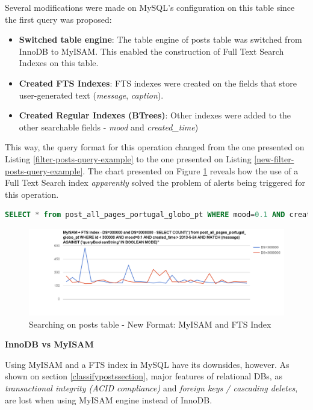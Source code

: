 Several modifications were made on MySQL's configuration on this table since the first query was proposed:
\begin{itemize}
\item{\textbf{Switched table engine}: The table engine of posts table was switched from InnoDB to MyISAM. This enabled the construction of Full Text Search Indexes on this table.}
\item{\textbf{Created FTS Indexes}: FTS indexes were created on the fields that store user-generated text (\textit{message}, \textit{caption}).}
\item{\textbf{Created Regular Indexes (BTrees)}: Other indexes were added to the other searchable fields - \textit{mood} and \textit{created\_time})}
\end{itemize}

This way, the query format for this operation changed from the one presented on Listing \ref{filter-posts-query-example} to the one presented on Listing \ref{new-filter-posts-query-example}. The chart presented on Figure \ref{fig:myISAM-FTSIndex} reveals how the use of a Full Text Search index \textit{apparently} solved the problem of alerts being triggered for this operation.  

\begin{lstlisting}[language=SQL,firstnumber=1, caption=New filter posts query format, label=new-filter-posts-query-example]
SELECT * from post_all_pages_portugal_globo_pt WHERE mood=0.1 AND created_time > 2013-5-24 AND MATCH (message) AGAINST ('booleanSearchString' IN BOOLEAN MODE)
\end{lstlisting} 


\begin{figure}[ht!]
	\centering
	\includegraphics[width=150mm]{Imagens/myISAM-FTSIndex.png}
	\caption{Searching on posts table - New Format: MyISAM and FTS Index \label{fig:myISAM-FTSIndex}}
\end{figure}


\noindent \textbf{InnoDB vs MyISAM}

Using MyISAM and a FTS index in MySQL have its downsides, however. As shown on section \ref{classifypostssection}, major features of relational DBs, as \textit{transactional integrity (ACID compliance)} and \textit{foreign keys / cascading deletes},  are lost when using MyISAM engine instead of InnoDB. 

